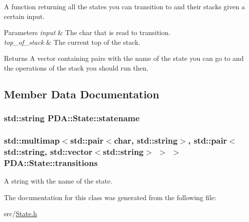 A function returning all the states you can transition to and their stacks given a certain input. 


\begin{DoxyParams}{Parameters}
{\em input} & The char that is read to transition. \\
\hline
{\em top\-\_\-of\-\_\-stack} & The current top of the stack. \\
\hline
\end{DoxyParams}
\begin{DoxyReturn}{Returns}
A vector containing pairs with the name of the state you can go to and the operations of the stack you should run then. 
\end{DoxyReturn}


\subsection{Member Data Documentation}
\hypertarget{classPDA_1_1State_afbfeb988281f28afbb9a0718e8e4eb67}{
\subsubsection[{statename}]{\setlength{\rightskip}{0pt plus 5cm}std\-::string P\-D\-A\-::\-State\-::statename\hspace{0.3cm}{\ttfamily [private]}}}\label{classPDA_1_1State_afbfeb988281f28afbb9a0718e8e4eb67}
\hypertarget{classPDA_1_1State_abbe5635de165a5a202ba1eb31ee61af1}{
\subsubsection[{transitions}]{\setlength{\rightskip}{0pt plus 5cm}std\-::multimap$<$std\-::pair$<$char, std\-::string$>$, std\-::pair$<$std\-::string, std\-::vector$<$std\-::string$>$ $>$ $>$ P\-D\-A\-::\-State\-::transitions\hspace{0.3cm}{\ttfamily [private]}}}\label{classPDA_1_1State_abbe5635de165a5a202ba1eb31ee61af1}


A string with the name of the state. 



The documentation for this class was generated from the following file\-:\begin{DoxyCompactItemize}
\item 
src/\hyperlink{State_8h}{State.\-h}\end{DoxyCompactItemize}

